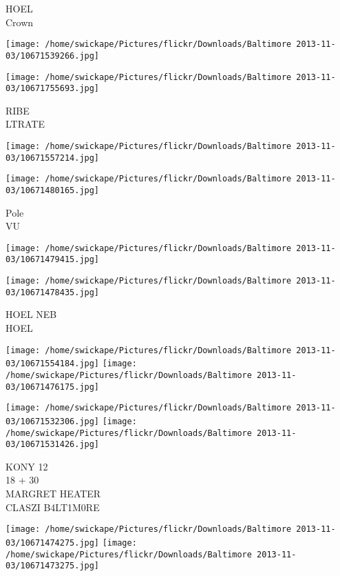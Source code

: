 \documentclass[10pt,letterpaper]{article}
\begin{document}
HOEL\\
Crown\\
\pagebreak

\texttt{[image: /home/swickape/Pictures/flickr/Downloads/Baltimore 2013-11-03/10671539266.jpg]}

\vspace{0.25in}
\texttt{[image: /home/swickape/Pictures/flickr/Downloads/Baltimore 2013-11-03/10671755693.jpg]}

RIBE\\
LTRATE\\
\pagebreak

\texttt{[image: /home/swickape/Pictures/flickr/Downloads/Baltimore 2013-11-03/10671557214.jpg]}

\vspace{0.25in}
\texttt{[image: /home/swickape/Pictures/flickr/Downloads/Baltimore 2013-11-03/10671480165.jpg]}

Pole\\
VU\\
\pagebreak

\texttt{[image: /home/swickape/Pictures/flickr/Downloads/Baltimore 2013-11-03/10671479415.jpg]}

\vspace{0.25in}
\texttt{[image: /home/swickape/Pictures/flickr/Downloads/Baltimore 2013-11-03/10671478435.jpg]}

HOEL NEB\\
HOEL\\
\pagebreak

\texttt{[image: /home/swickape/Pictures/flickr/Downloads/Baltimore 2013-11-03/10671554184.jpg]}
\texttt{[image: /home/swickape/Pictures/flickr/Downloads/Baltimore 2013-11-03/10671476175.jpg]}

\texttt{[image: /home/swickape/Pictures/flickr/Downloads/Baltimore 2013-11-03/10671532306.jpg]}
\texttt{[image: /home/swickape/Pictures/flickr/Downloads/Baltimore 2013-11-03/10671531426.jpg]}

KONY 12\\
18 + 30\\
MARGRET HEATER\\
CLASZI B4LT1M0RE\\
\pagebreak

\texttt{[image: /home/swickape/Pictures/flickr/Downloads/Baltimore 2013-11-03/10671474275.jpg]}
\texttt{[image: /home/swickape/Pictures/flickr/Downloads/Baltimore 2013-11-03/10671473275.jpg]}
\end{document}
